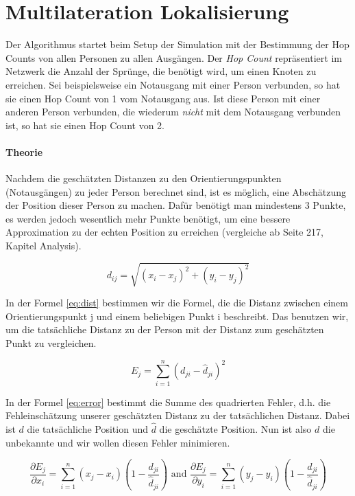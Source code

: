 \section{Multilateration Lokalisierung}
\label{sec:gradient_localization}

Der Algorithmus startet beim Setup der Simulation mit der Bestimmung der Hop Counts von allen Personen zu allen Ausgängen. Der \emph{Hop Count} repräsentiert im Netzwerk die Anzahl der Sprünge, die benötigt wird, um einen Knoten zu erreichen. Sei beispielsweise ein Notausgang mit einer Person verbunden, so hat sie einen Hop Count von 1 vom Notausgang aus. Ist diese Person mit einer anderen Person verbunden, die wiederum \emph{nicht} mit dem Notausgang verbunden ist, so hat sie einen Hop Count von 2.

\paragraph{Theorie} 

Nachdem die geschätzten Distanzen zu den Orientierungspunkten (Notausgängen) zu jeder Person berechnet sind, ist es möglich, eine Abschätzung der Position dieser Person zu machen. Dafür benötigt man mindestens 3 Punkte, es werden jedoch wesentlich mehr Punkte benötigt, um eine bessere Approximation zu der echten Position zu erreichen (vergleiche \cite{Jonathan.2004} ab Seite 217, Kapitel Analysis). 

\begin{equation} \label{eq:dist}
d_{ij} = \sqrt{(x_i - x_j)^2 + (y_i - y_j)^2}
\end{equation}

In der Formel \ref{eq:dist} bestimmen wir die Formel, die die Distanz zwischen einem Orientierungspunkt j und einem beliebigen Punkt i beschreibt. Das benutzen wir, um die tatsächliche Distanz zu der Person mit der Distanz zum geschätzten Punkt zu vergleichen.

\begin{equation} \label{eq:error}
E_j = \sum_{i=1}^{n} (d_{ji} - \hat d_{ji})^2
\end{equation}

In der Formel \ref{eq:error} bestimmt die Summe des quadrierten Fehler, d.h. die Fehleinschätzung unserer geschätzten Distanz zu der tatsächlichen Distanz. Dabei ist \( d \) die tatsächliche Position und \( \hat d \) die geschätzte Position. Nun ist also \( d \) die unbekannte und wir wollen diesen Fehler minimieren.

\begin{equation} \label{eq:abl}
 \frac{\partial E_j}{\partial x_i} = \sum_{i=1}^{n}(x_j - x_i) \left( 1-\frac{d_{ji}}{\hat d_{ji}} \right) \textrm{ and }  \frac{\partial E_j}{\partial y_i} = \sum_{i=1}^{n}(y_j - y_i) \left( 1-\frac{d_{ji}}{\hat d_{ji}} \right)
\end{equation}

